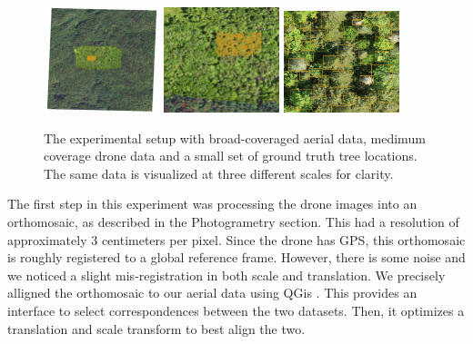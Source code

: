 \begin{figure}
    \centering
    \includegraphics[width=0.3\textwidth]{figs/methods/tree_detection/multiscale_outset.png}
    \includegraphics[width=0.3\textwidth]{figs/methods/tree_detection/multiscale_inset.png}
    \includegraphics[width=0.3\textwidth]{figs/methods/tree_detection/multiscale_in_inset.png}
    \caption{The experimental setup with broad-coveraged aerial data, medimum coverage drone data and a small set of ground truth tree locations. The same data is visualized at three different scales for clarity.}
    \label{fig:methods:multi_scale_tree_det}
\end{figure}

The first step in this experiment was processing the drone images into an orthomosaic, as described in the Photogrametry section. This had a resolution of approximately 3 centimeters per pixel. Since the drone has GPS, this orthomosaic is roughly registered to a global reference frame. However, there is some noise and we noticed a slight mis-registration in both scale and translation. We precisely alligned the orthomosaic to our aerial data using QGis \cite{QGIS_software}. This provides an interface to select correspondences between the two datasets. Then, it optimizes a translation and scale transform to best align the two. 

